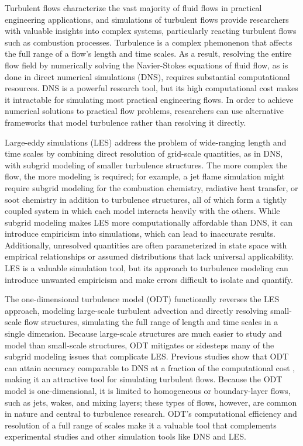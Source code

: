 \documentclass[preprint,12pt, a4paper]{elsarticle}
\begin{document}
Turbulent flows characterize the vast majority of fluid flows in practical engineering applications, and simulations of turbulent flows provide researchers with valuable insights into complex systems, particularly reacting turbulent flows such as combustion processes. Turbulence is a complex phemonenon that affects the full range of a flow's length and time scales. As a result, resolving the entire flow field by numerically solving the Navier-Stokes equations of fluid flow, as is done in direct numerical simulations (DNS), requires substantial computational resources. DNS is a powerful research tool, but its high computational cost makes it intractable for simulating most practical engineering flows. In order to achieve numerical solutions to practical flow problems, researchers can use alternative frameworks that model turbulence rather than resolving it directly.

Large-eddy simulations (LES) address the problem of wide-ranging length and time scales by combining  direct resolution of grid-scale quantities, as in DNS, with subgrid modeling of smaller turbulence structures. The more complex the flow, the more modeling is required; for example, a jet flame simulation might require subgrid modeling for the combustion chemistry, radiative heat transfer, or soot chemistry in addition to turbulence structures, all of which form a tightly coupled system in which each model interacts heavily with the others. While subgrid modeling makes LES more computationally affordable than DNS, it can introduce empiricism into simulations, which can lead to inaccurate results. Additionally, unresolved quantities are often parameterized in state space with empirical relationships or assumed distributions that lack universal applicability. LES is a valuable simulation tool, but its approach to turbulence modeling can introduce unwanted empiricism and make errors difficult to isolate and quantify.

The one-dimensional turbulence model (ODT) functionally reverses the LES approach, modeling large-scale turbulent advection and directly resolving small-scale flow structures, simulating the full range of length and time scales in a single dimension. Because large-scale structures are much easier to study and model than small-scale structures, ODT mitigates or sidesteps many of the subgrid modeling issues that complicate LES. Previous studies show that ODT can attain accuracy comparable to DNS at a fraction of the computational cost \cite{Lignell_2015,Abboud_2015}, making it an attractive tool for simulating turbulent flows. Because the ODT model is one-dimensional, it is limited to homogeneous or boundary-layer flows, such as jets, wakes, and mixing layers; these types of flows, however, are common in nature and central to turbulence research. ODT's computational efficiency and resolution of a full range of scales make it a valuable tool that complements experimental studies and other simulation tools like DNS and LES. 
\end{document}
